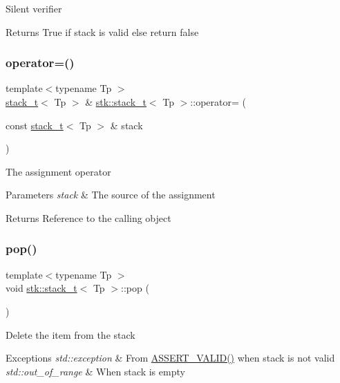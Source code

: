 Silent verifier \begin{DoxyReturn}{Returns}
True if stack is valid else return false 
\end{DoxyReturn}
\mbox{\label{classstk_1_1stack__t_ae89dec429ddba4dda06f6c57fc688cc9}} 
\subsubsection{\texorpdfstring{operator=()}{operator=()}}
{\footnotesize\ttfamily template$<$typename Tp $>$ \\
\hyperlink{classstk_1_1stack__t}{stack\+\_\+t}$<$ Tp $>$ \& \hyperlink{classstk_1_1stack__t}{stk\+::stack\+\_\+t}$<$ Tp $>$\+::operator= (\begin{DoxyParamCaption}\item[{const \hyperlink{classstk_1_1stack__t}{stack\+\_\+t}$<$ Tp $>$ \&}]{stack }\end{DoxyParamCaption})}

The assignment operator 
\begin{DoxyParams}{Parameters}
{\em stack} & The source of the assignment \\
\hline
\end{DoxyParams}
\begin{DoxyReturn}{Returns}
Reference to the calling object 
\end{DoxyReturn}
\mbox{\label{classstk_1_1stack__t_a498151ba872e2b9ae2f9326b80efbbd3}} 
\subsubsection{\texorpdfstring{pop()}{pop()}}
{\footnotesize\ttfamily template$<$typename Tp $>$ \\
void \hyperlink{classstk_1_1stack__t}{stk\+::stack\+\_\+t}$<$ Tp $>$\+::pop (\begin{DoxyParamCaption}{ }\end{DoxyParamCaption})}

Delete the item from the stack 
\begin{DoxyExceptions}{Exceptions}
{\em std\+::exception} & From \hyperlink{stack_8h_a4ad7af85cae2910ffcf6bfbcb8278886}{A\+S\+S\+E\+R\+T\+\_\+\+V\+A\+L\+I\+D()} when stack is not valid \\
\hline
{\em std\+::out\+\_\+of\+\_\+range} & When stack is empty \\
\hline
\end{DoxyExceptions}
\mbox{\label{classstk_1_1stack__t_a17e043f3eb3b4ae3b0494a4e0ff1a1b5}} 
